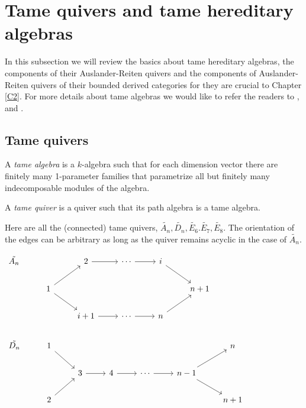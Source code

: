 \section{Tame quivers and tame hereditary algebras}
\indent In this subsection we will review the basics about tame hereditary algebras, the components of their Auslander-Reiten quivers and the components of Auslander-Reiten quivers of their bounded derived categories for they are crucial to Chapter \ref{C2}. For more details about tame algebras we would like to refer the readers to \cite{DR76}, \cite{R84} and \cite{SS06}.\\
\subsection{Tame quivers}
\begin{definition}
A \textit{tame algebra} is a $k$-algebra such that for each dimension vector there are finitely many 1-parameter families that parametrize all but finitely many indecomposable modules of the algebra.\\
\end{definition}
\begin{definition}
A \textit{tame quiver} is a quiver such that its path algebra is a tame algebra.\\
\end{definition}
\begin{example}
Here are all the (connected) tame quivers, $\tilde{A_n}, \tilde{D_n}, \tilde{E_6}. \tilde{E_7}, \tilde{E_8}$. The orientation of the edges can be arbitrary as long as the quiver remains acyclic in the case of $\tilde{A_n}$.
\end{example}
$\begin{tikzcd}
\tilde{A_n} &    		&2\arrow[r]  &\cdots\arrow[r]    &i\arrow[rd]	 &\\
&1\arrow[rd]\arrow[ru]& 		  &  				&   		&n+1\\
&     				&i+1\arrow[r]&\cdots\arrow[r] 	&n\arrow[ru]& \\
\end{tikzcd}$\\
$\begin{tikzcd}
\tilde{D_n} &1\arrow[rd] &  		& 		     &		         		&					&n	\\
&		&3\arrow[r]&  4\arrow[r] & \cdots\arrow[r]           &n-1\arrow[rd]\arrow[ru] 	&\\
&2\arrow[ru]&		&   		    & 					& 					&n+1\\
\end{tikzcd}$\\
